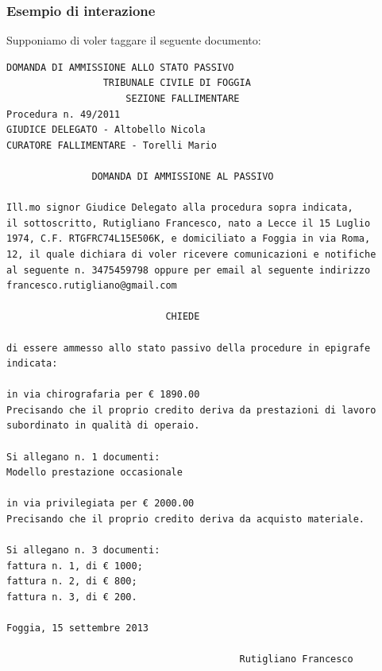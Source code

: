 \subsubsection{Esempio di interazione}
	Supponiamo di voler taggare il seguente documento:
	
	\small
	\label{doc-example}
	\begin{Verbatim}[frame=single,framesep=3mm]
	  DOMANDA DI AMMISSIONE ALLO STATO PASSIVO
                 TRIBUNALE CIVILE DI FOGGIA
                     SEZIONE FALLIMENTARE
Procedura n. 49/2011
GIUDICE DELEGATO - Altobello Nicola
CURATORE FALLIMENTARE - Torelli Mario
                   
               DOMANDA DI AMMISSIONE AL PASSIVO

Ill.mo signor Giudice Delegato alla procedura sopra indicata, 
il sottoscritto, Rutigliano Francesco, nato a Lecce il 15 Luglio
1974, C.F. RTGFRC74L15E506K, e domiciliato a Foggia in via Roma,
12, il quale dichiara di voler ricevere comunicazioni e notifiche
al seguente n. 3475459798 oppure per email al seguente indirizzo
francesco.rutigliano@gmail.com

                            CHIEDE

di essere ammesso allo stato passivo della procedure in epigrafe
indicata:

in via chirografaria per € 1890.00
Precisando che il proprio credito deriva da prestazioni di lavoro 
subordinato in qualità di operaio.

Si allegano n. 1 documenti:
Modello prestazione occasionale

in via privilegiata per € 2000.00
Precisando che il proprio credito deriva da acquisto materiale.

Si allegano n. 3 documenti:
fattura n. 1, di € 1000;
fattura n. 2, di € 800;
fattura n. 3, di € 200.

Foggia, 15 settembre 2013

                                         Rutigliano Francesco
	\end{Verbatim}

